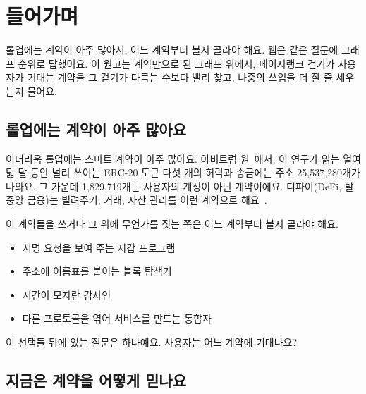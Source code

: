 \section{들어가며}

\begin{yoji}
롤업에는 계약이 아주 많아서, 어느 계약부터 볼지 골라야 해요. 웹은 같은 질문에 그래프 순위로 답했어요. 이 원고는 계약만으로 된 그래프 위에서, 페이지랭크 걷기가 사용자가 기대는 계약을 그 걷기가 다듬는 수보다 빨리 찾고, 나중의 쓰임을 더 잘 줄 세우는지 물어요.
\end{yoji}

\subsection{롤업에는 계약이 아주 많아요}

이더리움 롤업에는 스마트 계약이 아주 많아요. 아비트럼 원~\cite{kalodner2018arbitrum}에서, 이 연구가 읽는 열여덟 달 동안 널리 쓰이는 ERC-20 토큰 다섯 개의 허락과 송금에는 주소 25,537,280개가 나와요. 그 가운데 1,829,719개는 사용자의 계정이 아닌 계약이에요. 디파이(DeFi, 탈중앙 금융)는 빌려주기, 거래, 자산 관리를 이런 계약으로 해요~\cite{schar2021defi,werner2022sok}.

이 계약들을 쓰거나 그 위에 무언가를 짓는 쪽은 어느 계약부터 볼지 골라야 해요.
\begin{itemize}
\item 서명 요청을 보여 주는 지갑 프로그램
\item 주소에 이름표를 붙이는 블록 탐색기
\item 시간이 모자란 감사인
\item 다른 프로토콜을 엮어 서비스를 만드는 통합자
\end{itemize}
이 선택들 뒤에 있는 질문은 하나예요. 사용자는 어느 계약에 기대나요?

\subsection{지금은 계약을 어떻게 믿나요}

